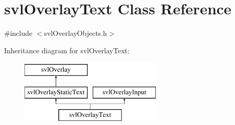 \hypertarget{classsvl_overlay_text}{}\section{svl\+Overlay\+Text Class Reference}
\label{classsvl_overlay_text}


{\ttfamily \#include $<$svl\+Overlay\+Objects.\+h$>$}

Inheritance diagram for svl\+Overlay\+Text\+:\begin{figure}[H]
\begin{center}
\leavevmode
\includegraphics[height=3.000000cm]{d5/de6/classsvl_overlay_text}
\end{center}
\end{figure}
